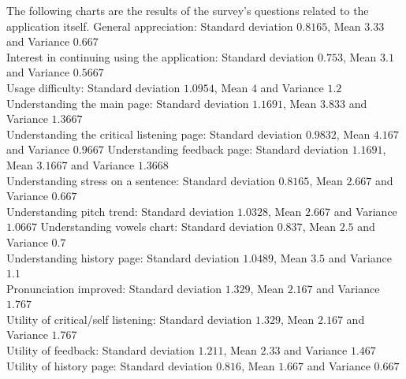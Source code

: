 \noindent The following charts are the results of the survey's questions related to the application itself.
\noindent General appreciation: Standard deviation $0.8165$, Mean $3.33$ and Variance $0.667$ \\
\noindent Interest in continuing using the application: Standard deviation $0.753$, Mean $3.1$ and Variance $0.5667$ \\
\noindent Usage difficulty: Standard deviation $1.0954$, Mean $4$ and Variance $1.2$ \\
\noindent Understanding the main page: Standard deviation $1.1691$, Mean $3.833$ and Variance $1.3667$ \\
\noindent Understanding the critical listening page: Standard deviation $0.9832$, Mean $4.167$ and Variance $0.9667$
\noindent Understanding feedback page: Standard deviation $1.1691$, Mean $3.1667$ and Variance $1.3668$ \\
\noindent Understanding stress on a sentence: Standard deviation $0.8165$, Mean $2.667$ and Variance $0.667$ \\
\noindent Understanding pitch trend: Standard deviation $1.0328$, Mean $2.667$ and Variance $1.0667$
\noindent Understanding vowels chart: Standard deviation $0.837$, Mean $2.5$ and Variance $0.7$ \\
\noindent Understanding history page: Standard deviation $1.0489$, Mean $3.5$ and Variance $1.1$ \\
\noindent Pronunciation improved: Standard deviation $1.329$, Mean $2.167$ and Variance $1.767$ \\
\noindent Utility of critical/self listening: Standard deviation $1.329$, Mean $2.167$ and Variance $1.767$ \\
\noindent Utility of feedback: Standard deviation $1.211$, Mean $2.33$ and Variance $1.467$ \\
\noindent Utility of history page: Standard deviation $0.816$, Mean $1.667$ and Variance $0.667$

